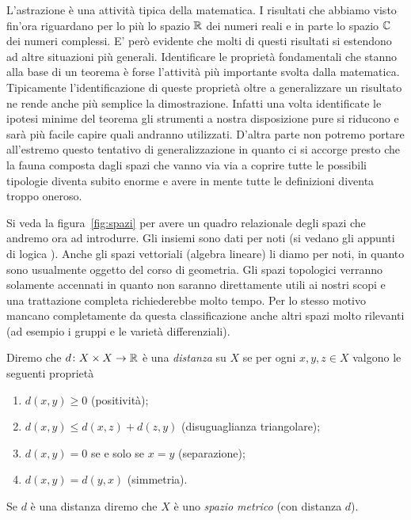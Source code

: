 L'astrazione è una attività tipica della matematica. I risultati che abbiamo
visto fin'ora riguardano per lo più lo spazio ${\mathbb R}$ dei numeri reali
e in parte lo spazio ${\mathbb C}$ dei numeri complessi.
E' però evidente che molti di questi risultati si estendono ad altre situazioni
più generali. Identificare le proprietà fondamentali che stanno alla base
di un teorema è forse l'attività più importante svolta dalla matematica.
Tipicamente l'identificazione di queste proprietà oltre a generalizzare
un risultato ne rende anche più semplice la dimostrazione.
Infatti una volta identificate le ipotesi minime del teorema
gli strumenti a nostra disposizione pure si riducono e sarà più facile
capire quali andranno utilizzati.
D'altra parte non potremo portare all'estremo questo tentativo di generalizzazione
in quanto ci si accorge presto che la fauna composta dagli spazi che vanno via
via a coprire tutte le possibili tipologie diventa subito enorme e avere
in mente tutte le definizioni diventa troppo oneroso.

Si veda la figura~\ref{fig:spazi} per avere un quadro relazionale
degli spazi che andremo ora ad introdurre.
Gli insiemi sono dati per noti (si vedano gli appunti di logica \cite{appunti_logica}).
Anche gli spazi vettoriali (algebra lineare) li diamo per noti, in quanto sono usualmente oggetto
del corso di geometria.
Gli spazi topologici verranno solamente accennati in quanto non saranno direttamente
utili ai nostri scopi e una trattazione completa richiederebbe molto tempo.
Per lo stesso motivo mancano completamente da questa classificazione anche altri
spazi molto rilevanti (ad esempio i gruppi e le varietà differenziali).


\begin{definition}
\mymark{**}
\label{def:distanza}
Diremo che $d\colon X\times X\to{\mathbb R}$ è una \emph{distanza}%
%
 su $X$
se per ogni $x,y,z\in X$ valgono le seguenti proprietà
\begin{enumerate}
\item
  $d(x,y)\ge 0$ (positività);
\item
  $d(x,y)\le d(x,z) + d(z,y)$ (disuguaglianza triangolare);
\item
  $d(x,y)=0$ se e solo se $x=y$ (separazione);
\item
  $d(x,y) = d(y,x)$ (simmetria).
\end{enumerate}

Se $d$ è una distanza
diremo che $X$ è uno
\emph{spazio metrico}
%
%
(con distanza $d$).
\end{definition}

